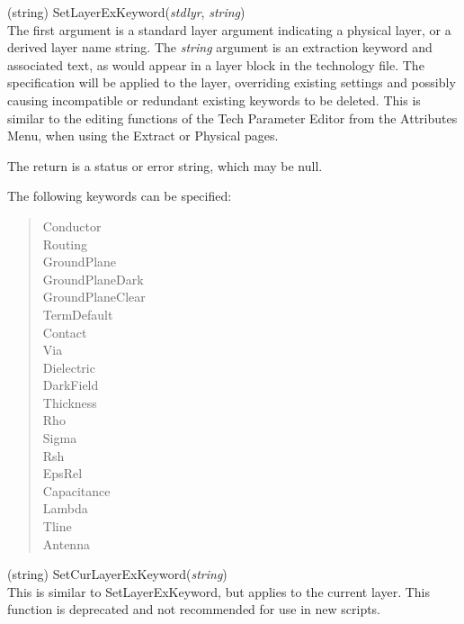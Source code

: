 \begin{description}
\item{(string) \vt SetLayerExKeyword({\it stdlyr\/}, {\it string\/})}\\
The first argument is a standard layer argument indicating a physical
layer, or a derived layer name string.  The {\it string} argument is
an extraction keyword and associated text, as would appear in a layer
block in the technology file.  The specification will be applied to
the layer, overriding existing settings and possibly causing
incompatible or redundant existing keywords to be deleted.  This is
similar to the editing functions of the {\cb Tech Parameter Editor}
from the {\cb Attributes Menu}, when using the {\cb Extract} or {\cb
Physical} pages.

The return is a status or error string, which may be null.
  
The following keywords can be specified:
\begin{quote}\vt
    Conductor\\
    Routing\\
    GroundPlane\\
    GroundPlaneDark\\
    GroundPlaneClear\\
    TermDefault\\
    Contact\\
    Via\\
    Dielectric\\
    DarkField\\
    Thickness\\
    Rho\\
    Sigma\\
    Rsh\\
    EpsRel\\
    Capacitance\\
    Lambda\\
    Tline\\
    Antenna
\end{quote}

\item{(string) \vt SetCurLayerExKeyword({\it string\/})}\\
This is similar to {\vt SetLayerExKeyword}, but applies to the current
layer.  This function is deprecated and not recommended for use in new
scripts.


\end{description}
